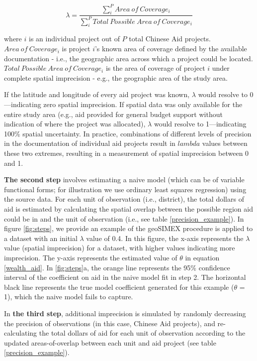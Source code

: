 \begin{equation}\label{lambda}
\lambda = \frac{\sum_{i}^{P}Area \ of \ Coverage_i}{\sum_{i}^{P}Total \ Possible \ Area \ of \ Coverage_i}
\end{equation}

\noindent where $i$ is an individual project out of $P$ total Chinese Aid projects. 
$Area \ of \ Coverage_i$ is project $i$'s known area of coverage defined by the available documentation - i.e., the geographic area across which a project could be located. 
$Total \ Possible \ Area \ of \ Coverage_i$ is the area of coverage of project $i$ under complete spatial imprecision - e.g., the geographic area of the study area.
\par
If the latitude and longitude of every aid project was known, $\lambda$ would resolve to 0---indicating zero spatial imprecision. 
If spatial data was only available for the entire study area (e.g., aid provided for general budget support without indication of where the project was allocated), $\lambda$ would resolve to 1---indicating 100\% spatial uncertainty. 
In practice, combinations of different levels of precision in the documentation of individual aid projects result in $lambda$ values between these two extremes, resulting in a measurement of spatial imprecision between 0 and 1.
\par
\textbf{The second step} involves estimating a naive model (which can be of variable functional forms; for illustration we use ordinary least squares regression) using the source data.
For each unit of observation (i.e., district), the total dollars of aid is estimated by calculating the spatial overlap between the possible region aid could be in and the unit of observation (i.e., see table \ref{precision_example}).
In figure \ref{fig:steps}, we provide an example of the geoSIMEX procedure is applied to a dataset with an initial $\lambda$ value of 0.4.
In this figure, the x-axis represents the $\lambda$ value (spatial imprecision) for a dataset, with higher values indicating more imprecision.
The y-axis represents the estimated value of $\theta$ in equation \ref{wealth_aid}.
In \ref{fig:steps}a, the orange line represents the 95\% confidence interval of the coefficient on aid in the naive model fit in step 2. 
The horizontal black line represents the true model coefficient generated for this example ($\theta$ = 1), which the naive model fails to capture.
\par 
In \textbf{the third step}, additional imprecision is simulated by randomly decreasing the precision of observations (in this case, Chinese Aid projects), and re-calculating the total dollars of aid for each unit of observation according to the updated areas-of-overlap between each unit and aid project (see table \ref{precision_example}). 

